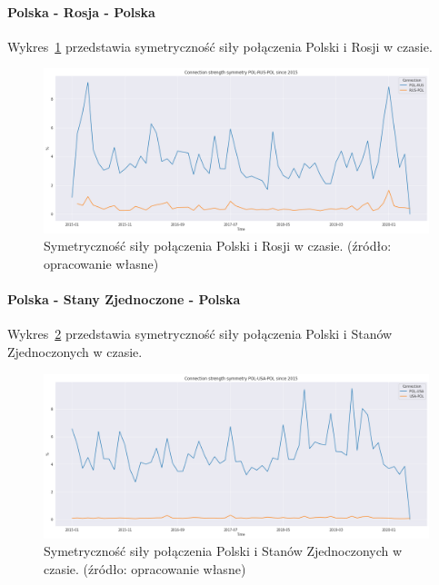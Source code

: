 \documentclass[11pt]{report}
\begin{document}
    \paragraph{Polska - Rosja - Polska}

    Wykres~\ref{fig:POL-RUS-POL} przedstawia symetryczność siły połączenia Polski i Rosji w czasie.


    \begin{figure}[!htp]
        \centering
        \includegraphics[width=\linewidth]{fig/ConnectionSymmetry/POL-RUS-POL.png}
        \caption{Symetryczność siły połączenia Polski i Rosji w czasie. (źródło: opracowanie własne)}
        \label{fig:POL-RUS-POL}
    \end{figure}

    \paragraph{Polska - Stany Zjednoczone - Polska}

    Wykres~\ref{fig:POL-USA-POL} przedstawia symetryczność siły połączenia Polski i Stanów Zjednoczonych w czasie.


    \begin{figure}[!htp]
        \centering
        \includegraphics[width=\linewidth]{fig/ConnectionSymmetry/POL-USA-POL.png}
        \caption{Symetryczność siły połączenia Polski i Stanów Zjednoczonych w czasie. (źródło: opracowanie własne)}
        \label{fig:POL-USA-POL}
    \end{figure}
\end{document}
